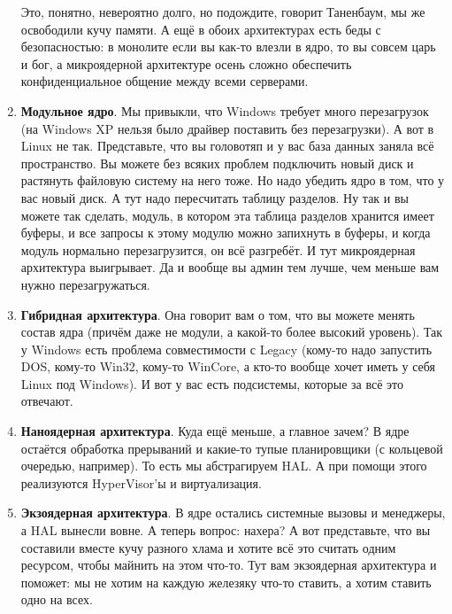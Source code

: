 \documentclass{article}
\begin{document}
\begin{enumerate}
        Это, понятно, невероятно долго, но подождите, говорит Таненбаум, мы же освободили кучу памяти. А ещё в обоих архитектурах есть беды с безопасностью: в монолите если вы как-то влезли в ядро, то вы совсем царь и бог, а микроядерной архитектуре осень сложно обеспечить конфиденциальное общение между всеми серверами.
        \item \textbf{Модульное ядро}. Мы привыкли, что Windows требует много перезагрузок (на Windows XP нельзя было драйвер поставить без перезагрузки). А вот в Linux не так. Представьте, что вы головотяп и у вас база данных заняла всё пространство. Вы можете без всяких проблем подключить новый диск и растянуть файловую систему на него тоже. Но надо убедить ядро в том, что у вас новый диск. А тут надо пересчитать таблицу разделов. Ну так и вы можете так сделать, модуль, в котором эта таблица разделов хранится имеет буферы, и все запросы к этому модулю можно запихнуть в буферы, и когда модуль нормально перезагрузится, он всё разгребёт. И тут микроядерная архитектура выигрывает. Да и вообще вы админ тем лучше, чем меньше вам нужно перезагружаться.
        \item \textbf{Гибридная архитектура}. Она говорит вам о том, что вы можете менять состав ядра (причём даже не модули, а какой-то более высокий уровень). Так у Windows есть проблема совместимости с Legacy (кому-то надо запустить DOS, кому-то Win32, кому-то WinCore, а кто-то вообще хочет иметь у себя Linux под Windows). И вот у вас есть подсистемы, которые за всё это отвечают.
        \item \textbf{Наноядерная архитектура}. Куда ещё меньше, а главное зачем? В ядре остаётся обработка прерываний и какие-то тупые планировщики (с кольцевой очередью, например). То есть мы абстрагируем HAL. А при помощи этого реализуются HyperVisor'ы и виртуализация.
        \item \textbf{Экзоядерная архитектура}. В ядре остались системные вызовы и менеджеры, а HAL вынесли вовне. А теперь вопрос: нахера? А вот представьте, что вы составили вместе кучу разного хлама и хотите всё это считать одним ресурсом, чтобы майнить на этом что-то. Тут вам экзоядерная архитектура и поможет: мы не хотим на каждую железяку что-то ставить, а хотим ставить одно на всех.
    \end{enumerate}
\end{document}
